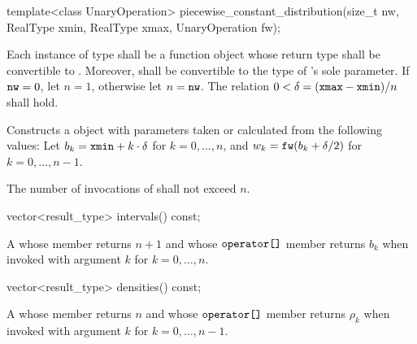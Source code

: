%
\begin{itemdecl}
template<class UnaryOperation>
 piecewise_constant_distribution(size_t nw, RealType xmin, RealType xmax, UnaryOperation fw);
\end{itemdecl}

\begin{itemdescr}
\pnum\requires
 Each instance of type 
 shall be a function object
 whose return type shall be convertible to .
 Moreover,
  shall be convertible
 to the type of 's sole parameter.
 If $\texttt{nw} = 0$, let $n = 1$, otherwise let $n = \texttt{nw}$.
 The relation $0 < \delta = (\texttt{xmax} - \texttt{xmin}) / n$
 shall hold.

\pnum\effects Constructs a  object
 with parameters taken or calculated
 from the following values:
 Let $b_k = \texttt{xmin} + k \cdot \delta $ for $ k = 0, \dotsc, n$,
 and $w_k = \texttt{fw}(b_k + \delta / 2) $ for $ k = 0, \dotsc, n - 1$.

\pnum\complexity
 The number of invocations of  shall not exceed $n$.
\end{itemdescr}

%
\begin{itemdecl}
vector<result_type> intervals() const;
\end{itemdecl}

\begin{itemdescr}
\pnum\returns A 
 whose  member returns $n + 1$
 and whose $ \texttt{operator[]} $ member returns $b_k$
 when invoked with argument $k$ for $k = 0, \dotsc, n $.
\end{itemdescr}

%
\begin{itemdecl}
vector<result_type> densities() const;
\end{itemdecl}

\begin{itemdescr}
\pnum\returns A 
 whose  member returns $n$
 and whose $ \texttt{operator[]} $ member returns $\rho_k$
 when invoked with argument $k$ for $k = 0, \dotsc, n - 1$.
\end{itemdescr}



